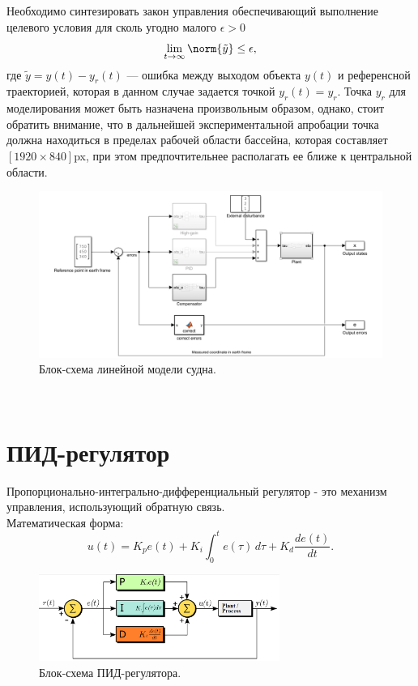 \documentclass[12pt]{article}
\begin{document}
Необходимо синтезировать закон управления обеспечивающий выполнение целевого условия для
сколь угодно малого $\epsilon > 0$
\[
\lim_{t \rightarrow \infty} \norm{\tilde{y}} \leq \epsilon,
\]
где $\tilde{y} = y(t) - y_r(t)$ — ошибка между выходом объекта $y(t)$ и референсной траекторией, которая в данном случае задается точкой $y_r(t) = y_r$. Точка $y_r$ для моделирования может быть назначена произвольным образом, однако, стоит обратить внимание, что в дальнейшей экспериментальной апробации точка должна находиться в пределах рабочей области бассейна, которая составляет $[1920 \times 840]$px, при этом предпочтительнее располагать ее ближе к центральной области.

\begin{figure}[H]
    \centering
    \includegraphics[width=\textwidth]{lin_model_scheme.png}
    \caption{Блок-схема линейной модели судна.}
    \label{fig:lin_model_scheme.png}
\end{figure}\\

\section*{ПИД-регулятор}
Пропорционально-интегрально-дифференциальный регулятор - это механизм управления, использующий обратную связь.\\
Математическая форма:
\[
u(t) = K_p e(t) + K_i \int_{0}^{t} e(\tau) \, d\tau + K_d \frac{de(t)}{dt}.
\]
\begin{figure}[H]
    \centering
    \includegraphics[width=0.7\textwidth]{PID_scheme.png}
    \caption{Блок-схема ПИД-регулятора.}
    \label{fig:PID_scheme.png}
\end{figure}\\
\end{document}
